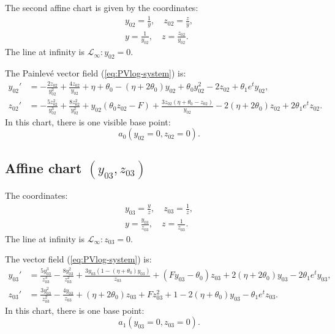 The second affine chart is given by the coordinates:
\begin{gather*}
y_{02}=\frac1{y},\quad  z_{02}=\frac{z}{y},
\\
y=\frac1{y_{02}},\quad z=\frac{z_{02}}{y_{02}}.
\end{gather*}
The line at infinity is $\mathcal{L}_{\infty} : y_{02}=0$.

The Painlev\'e vector field (\ref{eq:PVlog-system}) is:
$$
\begin{aligned}
y_{02}'&= - \frac{ 2 z_{02}}{y_{02}^2} + \frac{4 z_{02}}{y_{02}}+\eta + \theta_0 - (\eta + 2 \theta_0) y_{02} + \theta_0 y_{02}^2 - 2 z_{02} 
+\theta_1 e^t y_{02},
\\
z_{02}'&= - \frac{5 z_{02}^2}{y_{02}^3} + \frac{8 z_{02}^2}{y_{02}^2} + 
 y_{02} ( \theta_0 z_{02}-F) + \frac{3z_{02} (\eta + \theta_0- z_{02})}{y_{02}}-2 (\eta+2\theta_0) z_{02}
 + 2 \theta_1 e^t  z_{02}.
\end{aligned}
$$
In this chart, there is one visible base point:
$$
a_0(y_{02}=0,z_{02}=0).
$$



\subsection{Affine chart $(y_{03},z_{03})$}\label{chart03}

The coordinates:
\begin{gather*}
y_{03}=\frac{y}{z},
\quad
z_{03}=\frac{1}{z},
\\
y=\frac{y_{03}}{z_{03}},
\quad
z=\frac1{z_{03}}.
\end{gather*}
The line at infinity is $\mathcal{L}_{\infty} : z_{03}=0$.


The vector field (\ref{eq:PVlog-system}) is:
$$
\begin{aligned}
y_{03}'&=  \frac{5 y_{03}^3}{z_{03}^3} - \frac{8 y_{03}^2}{z_{03}^2} + 
\frac{ 3 y_{03}(1-( \eta+\theta_0) y_{03})}{z_{03}} + ( F y_{03}-\theta_0 ) z_{03}
+2 (\eta+2\theta_0) y_{03}
-2 \theta_1  e^t   y_{03}
,
\\
z_{03}'&=\frac{3 y_{03}^2}{z_{03}^2} - \frac{4 y_{03}}{z_{03}} + 
 (\eta + 2 \theta_0) z_{03} + F z_{03}^2 +1 - 2 (\eta + \theta_0) y_{03} 
 - \theta_1 e^t z_{03}.
\end{aligned}
$$
In this chart, there is one base point:
$$
a_1(y_{03}=0,z_{03}=0).
$$




